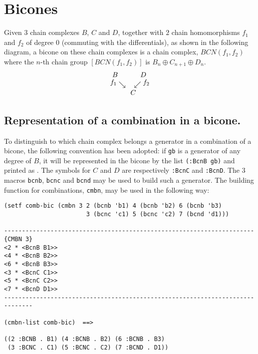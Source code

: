 \newpage

\section {Bicones}

Given $3$ chain complexes $B$, $C$ and $D$, together with $2$ 
chain homomorphisms $f_1$ and $f_2$ of degree $0$ (commuting with the differentials),
as shown in the following diagram, a bicone on these chain complexes is a chain
complex, $BCN(f_1,f_2)$ where the $n$-th chain group $[BCN(f_1,f_2)]$ is $B_n \oplus C_{n+1} \oplus D_n$.
$$
\begin{array}{l}
\hspace{4pt}B \hspace{32pt} D \\
\hspace{1pt} \raisebox{3pt}{$f_1$} \searrow \hspace{12pt}
             \swarrow \raisebox{3pt}{$f_2$} \\
\hspace{30pt} C 
\end{array}
$$


\subsection {Representation of a combination in a bicone.}

To distinguish to which chain complex belongs a generator in a combination of a bicone, the following convention
has been adopted: if {\tt gb} is a generator of any degree of $B$, it will be represented in the bicone
by the list {\tt (:BcnB gb)} and printed as {\tt <BcnB gb>}. The symbols for $C$ and $D$ are respectively
{\tt :BcnC} and {\tt :BcnD}. The $3$ macros {\tt bcnb}, {\tt bcnc} and {\tt bcnd} may be used to build
such a generator. The building function for combinations,  {\tt cmbn}, may be used in the following way:
{\footnotesize\begin{verbatim}
(setf comb-bic (cmbn 3 2 (bcnb 'b1) 4 (bcnb 'b2) 6 (bcnb 'b3) 
                       3 (bcnc 'c1) 5 (bcnc 'c2) 7 (bcnd 'd1)))

----------------------------------------------------------------------{CMBN 3}
<2 * <BcnB B1>>
<4 * <BcnB B2>>
<6 * <BcnB B3>>
<3 * <BcnC C1>>
<5 * <BcnC C2>>
<7 * <BcnD D1>>
------------------------------------------------------------------------------

(cmbn-list comb-bic)  ==>

((2 :BCNB . B1) (4 :BCNB . B2) (6 :BCNB . B3) 
 (3 :BCNC . C1) (5 :BCNC . C2) (7 :BCND . D1))
\end{verbatim}}

